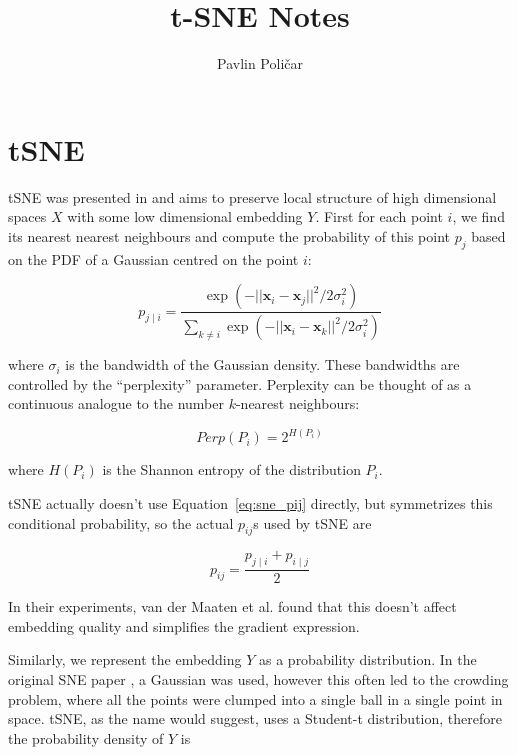 \documentclass[11pt]{article}
\begin{document}
\title{t-SNE Notes}
\author{Pavlin Poličar}
\date{}
\maketitle

\section{tSNE}

tSNE was presented in \cite{maaten2008visualizing} and aims to preserve local structure of high dimensional spaces $X$ with some low dimensional embedding $Y$. First for each point $i$, we find its nearest nearest neighbours and compute the probability of this point $p_j$ based on the PDF of a Gaussian centred on the point $i$:

\begin{equation}\label{eq:sne_pij}
p_{j \mid i} = \frac{\exp{\left (- || \mathbf{x}_i - \mathbf{x}_j ||^2 / 2\sigma_i^2 \right )}}{\sum_{k \neq i}\exp{\left (- || \mathbf{x}_i - \mathbf{x}_k ||^2 / 2\sigma_i^2 \right )}}
\end{equation}

where $\sigma_i$ is the bandwidth of the Gaussian density. These bandwidths are controlled by the ``perplexity'' parameter. Perplexity can be thought of as a continuous analogue to the number $k$-nearest neighbours:

\begin{equation}
Perp(P_i) = 2^{H(P_i)}
\end{equation}

where $H(P_i)$ is the Shannon entropy of the distribution $P_i$.

tSNE actually doesn't use Equation~\ref{eq:sne_pij} directly, but symmetrizes this conditional probability, so the actual $p_{ij}$s used by tSNE are

\begin{equation}
p_{ij} = \frac{p_{j\mid i} + p_{i \mid j}}{2}
\end{equation}

In their experiments, van der Maaten et al. found that this doesn't affect embedding quality and simplifies the gradient expression.

Similarly, we represent the embedding $Y$ as a probability distribution. In the original SNE paper \cite{hinton2003stochastic}, a Gaussian was used, however this often led to the crowding problem, where all the points were clumped into a single ball in a single point in space. tSNE, as the name would suggest, uses a Student-t distribution, therefore the probability density of $Y$ is
\end{document}
